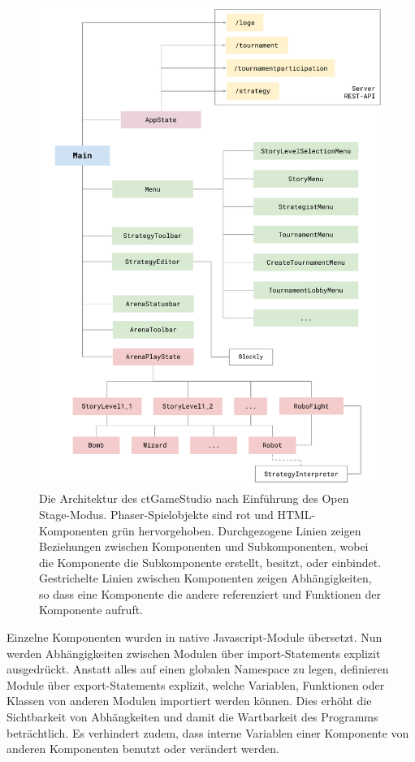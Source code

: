 \begin{figure}
  \centering

  \caption{Die Architektur des ctGameStudio nach Einführung des Open Stage-Modus.
  Phaser-Spielobjekte sind rot und HTML-Komponenten grün hervorgehoben. Durchgezogene Linien zeigen
  Beziehungen zwischen Komponenten und Subkomponenten, wobei die Komponente die Subkomponente
  erstellt, besitzt, oder einbindet. Gestrichelte Linien zwischen Komponenten zeigen Abhängigkeiten,
  so dass eine Komponente die andere referenziert und Funktionen der Komponente aufruft.}

  \includegraphics[scale=0.8]{figures/architektur.pdf}

  \label{architektur}
\end{figure}

Einzelne Komponenten wurden in native Javascript-Module übersetzt. Nun werden Abhängigkeiten
zwischen Modulen über import-Statements explizit ausgedrückt. Anstatt alles auf einen globalen
Namespace zu legen, definieren Module über export-Statements explizit, welche Variablen, Funktionen
oder Klassen von anderen Modulen importiert werden können. Dies erhöht die Sichtbarkeit von
Abhängkeiten und damit die Wartbarkeit des Programms beträchtlich. Es verhindert zudem, dass interne
Variablen einer Komponente von anderen Komponenten benutzt oder verändert werden.

